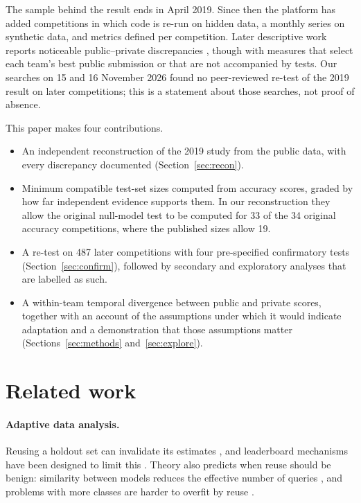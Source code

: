\documentclass[10pt]{article}
\begin{document}
The sample behind the result ends in April 2019. Since then the platform has added competitions in which code is re-run on hidden data, a monthly series on synthetic data, and metrics defined per competition. Later descriptive work reports noticeable public--private discrepancies \citep{bonisch2025chronicles,burtch2026monoculture}, though with measures that select each team's best public submission or that are not accompanied by tests. Our searches on 15 and 16 November 2026 found no peer-reviewed re-test of the 2019 result on later competitions; this is a statement about those searches, not proof of absence.

This paper makes four contributions.
\begin{itemize}
\item An independent reconstruction of the 2019 study from the public data, with every discrepancy documented (Section~\ref{sec:recon}).
\item Minimum compatible test-set sizes computed from accuracy scores, graded by how far independent evidence supports them. In our reconstruction they allow the original null-model test to be computed for 33 of the 34 original accuracy competitions, where the published sizes allow 19.
\item A re-test on 487 later competitions with four pre-specified confirmatory tests (Section~\ref{sec:confirm}), followed by secondary and exploratory analyses that are labelled as such.
\item A within-team temporal divergence between public and private scores, together with an account of the assumptions under which it would indicate adaptation and a demonstration that those assumptions matter (Sections~\ref{sec:methods} and~\ref{sec:explore}).
\end{itemize}

\section{Related work}

\paragraph{Adaptive data analysis.} Reusing a holdout set can invalidate its estimates \citep{dwork2015reusable}, and leaderboard mechanisms have been designed to limit this \citep{blum2015ladder}. Theory also predicts when reuse should be benign: similarity between models reduces the effective number of queries \citep{mania2019similarity}, and problems with more classes are harder to overfit by reuse \citep{feldman2019multiclass}.
\end{document}
